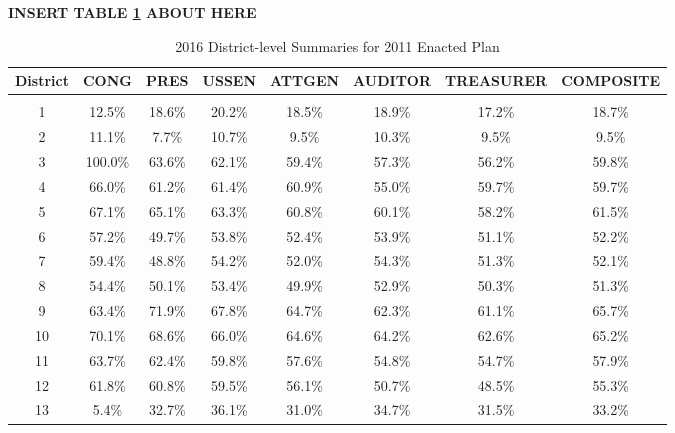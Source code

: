 


 \begin{center}\textbf{INSERT TABLE \ref{tab:districtvotes} ABOUT HERE} \end{center}


\begin{table}[!htbp] \centering 
  \caption{2016 District-level Summaries for 2011 Enacted Plan} 
  \label{tab:districtvotes} 
\begin{tabular}{@{\extracolsep{-5pt}} cccccccc} 
District & CONG & PRES & USSEN & ATTGEN & AUDITOR & TREASURER & COMPOSITE \\ 
\hline \\[-1.8ex] 
1 &  12.5\% & 18.6\% & 20.2\% & 18.5\% & 18.9\% & 17.2\% & 18.7\% \\ 
2 &  11.1\% &  7.7\% & 10.7\% &  9.5\% & 10.3\% &  9.5\% &  9.5\% \\ 
3 & 100.0\% & 63.6\% & 62.1\% & 59.4\% & 57.3\% & 56.2\% & 59.8\% \\ 
4 &  66.0\% & 61.2\% & 61.4\% & 60.9\% & 55.0\% & 59.7\% & 59.7\% \\ 
5 &  67.1\% & 65.1\% & 63.3\% & 60.8\% & 60.1\% & 58.2\% & 61.5\% \\ 
6 &  57.2\% & 49.7\% & 53.8\% & 52.4\% & 53.9\% & 51.1\% & 52.2\% \\ 
7 &  59.4\% & 48.8\% & 54.2\% & 52.0\% & 54.3\% & 51.3\% & 52.1\% \\ 
8 &  54.4\% & 50.1\% & 53.4\% & 49.9\% & 52.9\% & 50.3\% & 51.3\% \\ 
9 &  63.4\% & 71.9\% & 67.8\% & 64.7\% & 62.3\% & 61.1\% & 65.7\% \\ 
10 &  70.1\% & 68.6\% & 66.0\% & 64.6\% & 64.2\% & 62.6\% & 65.2\% \\ 
11 &  63.7\% & 62.4\% & 59.8\% & 57.6\% & 54.8\% & 54.7\% & 57.9\% \\ 
12 &  61.8\% & 60.8\% & 59.5\% & 56.1\% & 50.7\% & 48.5\% & 55.3\% \\ 
13 &   5.4\% & 32.7\% & 36.1\% & 31.0\% & 34.7\% & 31.5\% & 33.2\% \\ 

\end{tabular}
\end{table}
